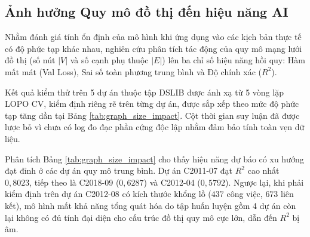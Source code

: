 \subsection{Ảnh hưởng Quy mô đồ thị đến hiệu năng AI}
\label{sec:3.2.4_graph_size_impact}

Nhằm đánh giá tính ổn định của mô hình khi ứng dụng vào các kịch bản thực tế có độ phức tạp khác nhau, nghiên cứu phân tích tác động của quy mô mạng lưới đồ thị (số nút $|V|$ và số cạnh phụ thuộc $|E|$) lên ba chỉ số hiệu năng hồi quy: Hàm mất mát (Val Loss), Sai số toàn phương trung bình và Độ chính xác ($R^2$). 

Kết quả kiểm thử trên 5 dự án thuộc tập DSLIB được ánh xạ từ 5 vòng lặp LOPO CV, kiểm định riêng rẽ trên từng dự án, được sắp xếp theo mức độ phức tạp tăng dần tại Bảng \ref{tab:graph_size_impact}. Cột thời gian suy luận đã được lược bỏ vì chưa có log đo đạc phần cứng độc lập nhằm đảm bảo tính toàn vẹn dữ liệu.

\begin{table}[H]
\centering
\caption{Ảnh hưởng của quy mô đồ thị dự án đến hiệu năng học sâu}
\label{tab:graph_size_impact}
\small
{}
\end{table}

Phân tích Bảng \ref{tab:graph_size_impact} cho thấy hiệu năng dự báo có xu hướng đạt đỉnh ở các dự án quy mô trung bình. Dự án C2011-07 đạt $R^2$ cao nhất $0,8023$, tiếp theo là C2018-09 ($0,6287$) và C2012-04 ($0,5792$). Ngược lại, khi phải kiểm định trên dự án C2012-08 có kích thước khổng lồ ($437$ công việc, $673$ liên kết), mô hình mất khả năng tổng quát hóa do tập huấn luyện gồm 4 dự án còn lại không có đủ tính đại diện cho cấu trúc đồ thị quy mô cực lớn, dẫn đến $R^2$ bị âm.

